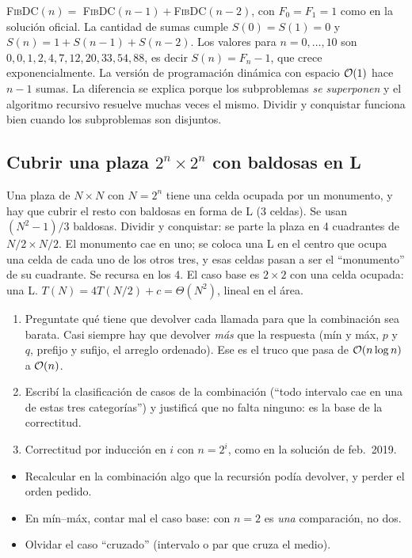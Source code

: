 \textsc{FibDC}$(n)=$ \textsc{FibDC}$(n-1)+$\textsc{FibDC}$(n-2)$, con $F_0=F_1=1$ como en la solución oficial. La cantidad de sumas cumple $S(0)=S(1)=0$ y $S(n)=1+S(n-1)+S(n-2)$. Los valores para $n=0,\dots,10$ son $0,0,1,2,4,7,12,20,33,54,88$, es decir $S(n)=F_n-1$, que crece exponencialmente. La versión de programación dinámica con espacio $\mathcal{O}(1)$ hace $n-1$ sumas. La diferencia se explica porque los subproblemas \emph{se superponen} y el algoritmo recursivo resuelve muchas veces el mismo. Dividir y conquistar funciona bien cuando los subproblemas son disjuntos.

\subsection{Cubrir una plaza $2^n\times 2^n$ con baldosas en L}

Una plaza de $N\times N$ con $N=2^n$ tiene una celda ocupada por un monumento, y hay que cubrir el resto con baldosas en forma de L (3 celdas). Se usan $(N^2-1)/3$ baldosas. Dividir y conquistar: se parte la plaza en 4 cuadrantes de $N/2\times N/2$. El monumento cae en uno; se coloca una L en el centro que ocupa una celda de cada uno de los otros tres, y esas celdas pasan a ser el ``monumento'' de su cuadrante. Se recursa en los 4. El caso base es $2\times2$ con una celda ocupada: una L. $T(N)=4T(N/2)+c=\Theta(N^2)$, lineal en el área.

\begin{receta}
\begin{enumerate}
  \item Preguntate qué tiene que devolver cada llamada para que la combinación sea barata. Casi siempre hay que devolver \emph{más} que la respuesta (mín y máx, $p$ y $q$, prefijo y sufijo, el arreglo ordenado). Ese es el truco que pasa de $\mathcal{O}(n\log n)$ a $\mathcal{O}(n)$.
  \item Escribí la clasificación de casos de la combinación (``todo intervalo cae en una de estas tres categorías'') y justificá que no falta ninguno: es la base de la correctitud.
  \item Correctitud por inducción en $i$ con $n=2^i$, como en la solución de feb.~2019.
\end{enumerate}
\end{receta}

\begin{trampa}
\begin{itemize}
  \item Recalcular en la combinación algo que la recursión podía devolver, y perder el orden pedido.
  \item En mín--máx, contar mal el caso base: con $n=2$ es \emph{una} comparación, no dos.
  \item Olvidar el caso ``cruzado'' (intervalo o par que cruza el medio).
\end{itemize}
\end{trampa}

